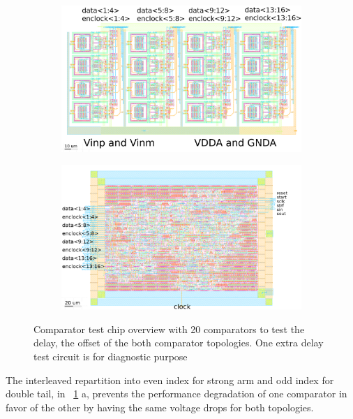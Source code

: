 \begin{figure}[htp]
    \centering
    \begin{subfigure}[b]{0.48\textwidth}
        \includegraphics[width=\textwidth]{Chapter5/Figs/comp_test/comparator_analog_offset_layout.png}
    \end{subfigure}
    \begin{subfigure}[b]{0.48\textwidth}
        \includegraphics[width=\textwidth]{Chapter5/Figs/comp_test/comparator_digital_offset_layout.png}
    \end{subfigure}
    \caption{Comparator test chip overview with 20 comparators to test the delay, the offset of the both comparator topologies. One extra delay test circuit is for diagnostic purpose}
    \label{fig:comp_offset_layout}
\end{figure}

The interleaved repartition into even index for strong arm and odd index for double tail, in \figurename~\ref{fig:comp_offset_layout} a, prevents the performance degradation of one comparator in favor of the other by having the same voltage drops for both topologies.

